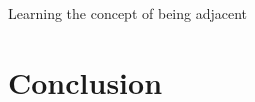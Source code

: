 \documentclass[12pt,twoside]{report}
\theoremstyle{plain}
\theoremstyle{definition}
\begin{document}
Learning the concept of being adjacent

\section{Conclusion}
\label{conclusion}


\clearpage
\appendix
\pagebreak
\begin{appendices}





\end{appendices}






\end{document}
